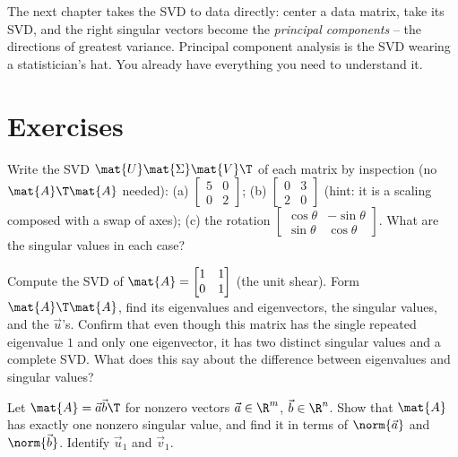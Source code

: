 The next chapter takes the SVD to data directly: center a data matrix, take its
SVD, and the right singular vectors become the \emph{principal components} -- the
directions of greatest variance. Principal component analysis is the SVD wearing a
statistician's hat. You already have everything you need to understand it.

\section{Exercises}
\label{ch29:exercises}

\begin{exercise}
\label{ch29:ex-readoff}
Write the SVD $\mat{U}\mat{\Sigma}\mat{V}\T$ of each matrix by inspection (no
$\mat{A}\T\mat{A}$ needed):
(a) $\begin{bmatrix} 5 & 0 \\ 0 & 2\end{bmatrix}$;
(b) $\begin{bmatrix} 0 & 3 \\ 2 & 0\end{bmatrix}$ (hint: it is a scaling
composed with a swap of axes);
(c) the rotation $\begin{bmatrix} \cos\theta & -\sin\theta \\ \sin\theta & \cos\theta\end{bmatrix}$.
What are the singular values in each case?
\end{exercise}

\begin{exercise}
\label{ch29:ex-full2x2}
Compute the SVD of $\mat{A} = \begin{bmatrix} 1 & 1 \\ 0 & 1\end{bmatrix}$ (the
unit shear). Form $\mat{A}\T\mat{A}$, find its eigenvalues and eigenvectors, the
singular values, and the $\vec{u}$'s. Confirm that even though this matrix has
the single repeated eigenvalue $1$ and only one eigenvector, it has two distinct
singular values and a complete SVD. What does this say about the difference
between eigenvalues and singular values?
\end{exercise}

\begin{exercise}
\label{ch29:ex-rankone}
Let $\mat{A} = \vec{a}\vec{b}\T$ for nonzero vectors $\vec{a}\in\R^m$,
$\vec{b}\in\R^n$. Show that $\mat{A}$ has exactly one nonzero singular value, and
find it in terms of $\norm{\vec{a}}$ and $\norm{\vec{b}}$. Identify $\vec{u}_1$
and $\vec{v}_1$.
\end{exercise}

